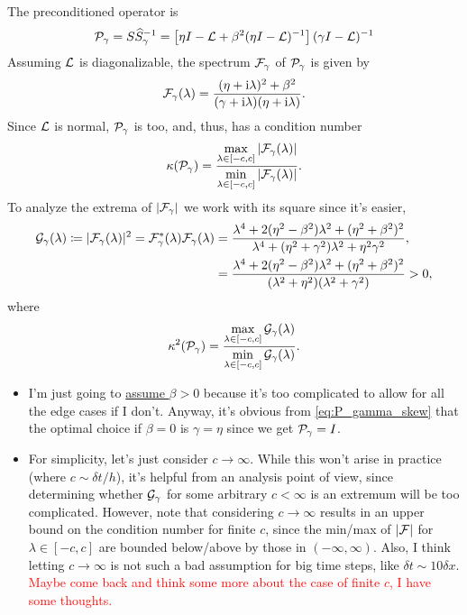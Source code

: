 \documentclass[a4paper,10pt]{article}
\newcommand{\tcr}{\textcolor{red}}
\begin{document}
{The preconditioned operator is
\begin{align}
\label{eq:P_gamma_skew}
{\cal P}_{\gamma} 
= 
S \widehat{S}_{\gamma}^{-1} 
= 
\left[ \eta I - {\cal L} +  \beta^2 (\eta I - {\cal L})^{-1} \right] (\gamma I - {\cal L})^{-1}
\end{align} 
Assuming ${\cal L}$ is diagonalizable, the spectrum ${\cal F}_{\gamma}$ of ${\cal P}_{\gamma}$ is given by
\begin{align}
\label{eq:F_skew}
{\cal F}_{\gamma}(\lambda) = \frac{(\eta + \mathrm{i} \lambda)^2 + \beta^2}{(\gamma + \mathrm{i} \lambda) (\eta + \mathrm{i} \lambda)}.
\end{align}
Since ${\cal L}$ is normal, ${\cal P}_{\gamma}$ is too, and, thus, has a condition number
\begin{align*}
\kappa ({\cal P}_{\gamma}) = \frac{\max \limits_{\lambda \in [-c, c]}  |{\cal F}_{\gamma}(\lambda)|}{\min \limits_{\lambda \in [-c, c]}  |{\cal F}_{\gamma}(\lambda)|}.
\end{align*}
To analyze the extrema of $|{\cal F}_{\gamma}|$ we work with its square since it's easier,
\begin{align} 
\label{eq:G_def}
{\cal G}_{\gamma}(\lambda) 
\coloneqq
|{\cal F}_{\gamma}(\lambda)|^2 
=
{\cal F}_{\gamma}^{*}(\lambda) {\cal F}_{\gamma}(\lambda)
&=
\frac{\lambda^4 +  2(\eta^2 - \beta^2) \lambda^2 + (\eta^2 + \beta^2)^2}{\lambda^4 + (\eta^2 + \gamma^2) \lambda^2 + \eta^2 \gamma^2}, \\
&=
\frac{\lambda^4 +  2(\eta^2 - \beta^2) \lambda^2 + (\eta^2 + \beta^2)^2}{(\lambda^2 + \eta^2)(\lambda^2 + \gamma^2)} > 0,
\end{align}
where
\begin{align}
\label{eq:cond_skew_def}
\kappa^2 ({\cal P}_{\gamma}) = \frac{\max \limits_{\lambda \in [-c, c]}  {\cal G}_{\gamma}(\lambda)}{\min \limits_{\lambda \in [-c, c]}  {\cal G}_{\gamma}(\lambda)}.
\end{align}


\begin{itemize}
\setlength\itemsep{1ex}

\item I'm just going to \underline{assume $\beta > 0$} because it's too complicated to allow for all the edge cases if I don't. Anyway, it's obvious from \eqref{eq:P_gamma_skew} that the optimal choice if $\beta = 0$ is $\gamma = \eta$ since we get ${\cal P}_{\gamma} = I$.

\item For simplicity, let's just consider $c \to \infty$. While this won't arise in practice (where $c \sim \delta t / h$), it's helpful from an analysis point of view, since determining whether ${\cal G}_{\gamma}$ for some arbitrary $c < \infty$ is an extremum will be too complicated. However, note that considering $c \to \infty$ results in an upper bound on the condition number for finite $c$, since the min/max of $|{\cal F}|$ for $\lambda \in [-c,c]$ are bounded below/above by those in $(-\infty, \infty)$. Also, I think letting $c \to \infty$ is not such a bad assumption for big time steps, like $\delta t \sim 10 \delta x$. \tcr{Maybe come back and think some more about the case of finite $c$, I have some thoughts.}


\end{itemize}}
\end{document}
